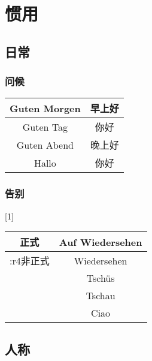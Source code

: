 \documentclass[hidelinks]{ctexart}
\begin{document}

\section{惯用} %
\label{sec:惯用}

\subsection{日常} %
\label{sub:日常}

\subsubsection{问候} %
\label{ssub:问候}

\begin{longtable}{|c|c|}
    \hline
    Guten Morgen & 早上好 \\
    \hline
    Guten Tag & 你好 \\
    \hline
    Guten Abend & 晚上好 \\
    \hline
    Hallo & 你好 \\
    \hline
\end{longtable}


\subsubsection{告别} %
\label{ssub:告别}

\leavevmode {}[1]
\begin{tabular}{|c|c|}
    \hline
    正式 & Auf Wiedersehen \\
    \hline
    \+:r4{非正式} & Wiedersehen \\
    & Tsch\"us \\
    & Tschau \\
    & Ciao \\
    \hline
\end{tabular}
\leavevmode



\subsection{人称} %
\label{sub:人称}
\end{document}
